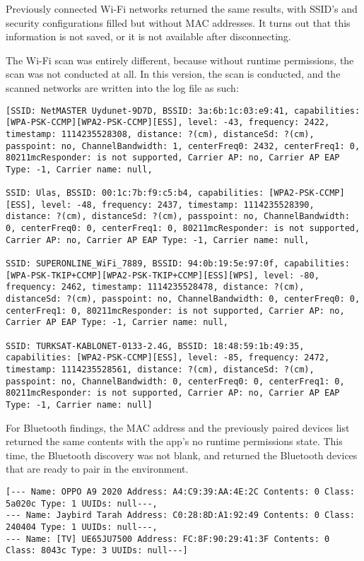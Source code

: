 \documentclass[
  a4paper,  %
  twoside,  %
  bibliography=totoc,
  headsepline,
  cleardoublepage=empty,
  parskip=half,
  draft=false,
  open=any
]{scrbook}
\begin{document}
Previously connected Wi-Fi networks returned the same results, with SSID's and security configurations filled but without MAC addresses. It turns out that this information is not saved, or it is not available after disconnecting.

The Wi-Fi scan was entirely different, because without runtime permissions, the scan was not conducted at all. In this version, the scan is conducted, and the scanned networks are written into the log file as such:
\begin{lstlisting}
[SSID: NetMASTER Uydunet-9D7D, BSSID: 3a:6b:1c:03:e9:41, capabilities: [WPA-PSK-CCMP][WPA2-PSK-CCMP][ESS], level: -43, frequency: 2422, timestamp: 1114235528308, distance: ?(cm), distanceSd: ?(cm), passpoint: no, ChannelBandwidth: 1, centerFreq0: 2432, centerFreq1: 0, 80211mcResponder: is not supported, Carrier AP: no, Carrier AP EAP Type: -1, Carrier name: null, 

SSID: Ulas, BSSID: 00:1c:7b:f9:c5:b4, capabilities: [WPA2-PSK-CCMP][ESS], level: -48, frequency: 2437, timestamp: 1114235528390, distance: ?(cm), distanceSd: ?(cm), passpoint: no, ChannelBandwidth: 0, centerFreq0: 0, centerFreq1: 0, 80211mcResponder: is not supported, Carrier AP: no, Carrier AP EAP Type: -1, Carrier name: null, 

SSID: SUPERONLINE_WiFi_7889, BSSID: 94:0b:19:5e:97:0f, capabilities: [WPA-PSK-TKIP+CCMP][WPA2-PSK-TKIP+CCMP][ESS][WPS], level: -80, frequency: 2462, timestamp: 1114235528478, distance: ?(cm), distanceSd: ?(cm), passpoint: no, ChannelBandwidth: 0, centerFreq0: 0, centerFreq1: 0, 80211mcResponder: is not supported, Carrier AP: no, Carrier AP EAP Type: -1, Carrier name: null, 

SSID: TURKSAT-KABLONET-0133-2.4G, BSSID: 18:48:59:1b:49:35, capabilities: [WPA2-PSK-CCMP][ESS], level: -85, frequency: 2472, timestamp: 1114235528561, distance: ?(cm), distanceSd: ?(cm), passpoint: no, ChannelBandwidth: 0, centerFreq0: 0, centerFreq1: 0, 80211mcResponder: is not supported, Carrier AP: no, Carrier AP EAP Type: -1, Carrier name: null]
\end{lstlisting}

For Bluetooth findings, the MAC address and the previously paired devices list returned the same contents with the app's no runtime permissions state. This time, the Bluetooth discovery was not blank, and returned the Bluetooth devices that are ready to pair in the environment.
\begin{lstlisting}
[--- Name: OPPO A9 2020 Address: A4:C9:39:AA:4E:2C Contents: 0 Class: 5a020c Type: 1 UUIDs: null---, 
--- Name: Jaybird Tarah Address: C0:28:8D:A1:92:49 Contents: 0 Class: 240404 Type: 1 UUIDs: null---, 
--- Name: [TV] UE65JU7500 Address: FC:8F:90:29:41:3F Contents: 0 Class: 8043c Type: 3 UUIDs: null---]
\end{lstlisting}
\end{document}

